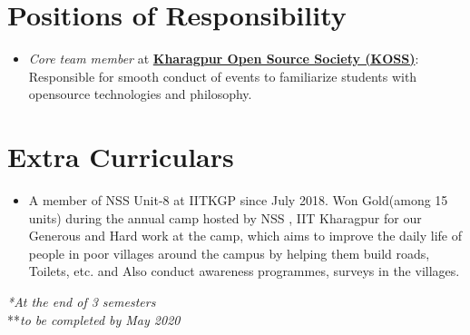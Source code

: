 \documentclass[letterpaper,11pt]{article}
\newcommand{\resumeSubHeadingListStart}{\begin{itemize}[leftmargin=*]}
\newcommand{\resumeSubHeadingListEnd}{\end{itemize}}
\begin{document}
\section{Positions of Responsibility}
  \resumeSubHeadingListStart
    \item{
      \textit{Core team member} at \textbf{\href{https://kossiitkgp.org/}{Kharagpur Open Source Society (KOSS)}}: Responsible for smooth conduct of events to familiarize students with opensource technologies and philosophy.
      \hfill
    }
  \resumeSubHeadingListEnd
\section{Extra Curriculars}
  \resumeSubHeadingListStart
    \item{
      {A member of NSS Unit-8 at IITKGP since July 2018. Won Gold(among 15 units) during the annual camp hosted by NSS , IIT Kharagpur for our Generous and Hard work at the camp, which aims to improve the daily life of people in poor villages around the campus by helping them build roads, Toilets, etc. and Also conduct awareness programmes, surveys in the villages. }
      \hfill
    }

  \resumeSubHeadingListEnd
  \textit{ *At the end of 3 semesters}\\
  {**}\textit{to be completed by May 2020}\\
\end{document}
